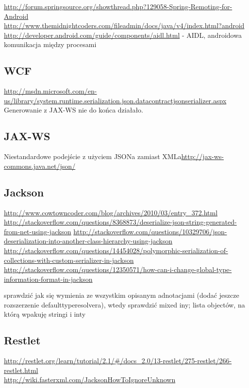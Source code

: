 \url{http://forum.springsource.org/showthread.php?129058-Spring-Remoting-for-Android}\\
\url{http://www.themidnightcoders.com/fileadmin/docs/java/v4/index.html?android}\\
\url{http://developer.android.com/guide/components/aidl.html} - AIDL, androidowa komunikacja między procesami\\


\subsection{WCF}
\url{http://msdn.microsoft.com/en-us/library/system.runtime.serialization.json.datacontractjsonserializer.aspx}\\
Generowanie z JAX-WS nie do końca działało.

\subsection{JAX-WS}
Niestandardowe podejście z użyciem JSONa zamiast XMLa\url{http://jax-ws-commons.java.net/json/}\\

\subsection{Jackson}
\url{http://www.cowtowncoder.com/blog/archives/2010/03/entry_372.html}\\
\url{http://stackoverflow.com/questions/8368873/deserialize-json-string-generated-from-net-using-jackson}
\url{http://stackoverflow.com/questions/10329706/json-deserialization-into-another-class-hierarchy-using-jackson}
\url{http://stackoverflow.com/questions/14454028/polymorphic-serialization-of-collections-with-custom-serializer-in-jackson}
\url{http://stackoverflow.com/questions/12350571/how-can-i-change-global-type-information-format-in-jackson}

sprawdzić jak się wymienia ze wszystkim opisanym adnotacjami (dodać jeszcze rozszerzenie defaulttyperesolvera), wtedy sprawdzić mixed iny; lista objectów, na którą wpakuję stringi i inty

\subsection{Restlet}
\url{http://restlet.org/learn/tutorial/2.1/#/docs_2.0/13-restlet/275-restlet/266-restlet.html}\\
\url{http://wiki.fasterxml.com/JacksonHowToIgnoreUnknown}\\

